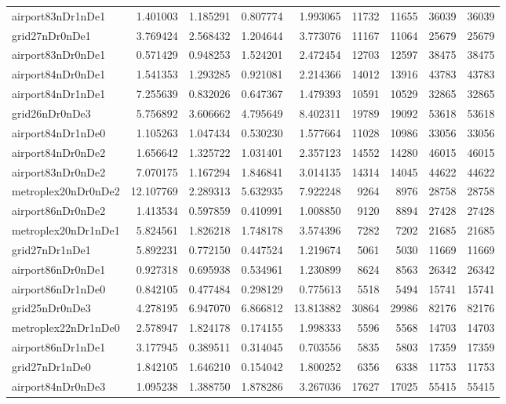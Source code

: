 \begin{longtable}{|l|r|r|r|r|r|r|r|r|}
airport83nDr1nDe1 & 1.401003 & 1.185291 & 0.807774 & 1.993065 & 11732 & 11655 & 36039 & 36039 \\
grid27nDr0nDe1 & 3.769424 & 2.568432 & 1.204644 & 3.773076 & 11167 & 11064 & 25679 & 25679 \\
airport83nDr0nDe1 & 0.571429 & 0.948253 & 1.524201 & 2.472454 & 12703 & 12597 & 38475 & 38475 \\
airport84nDr0nDe1 & 1.541353 & 1.293285 & 0.921081 & 2.214366 & 14012 & 13916 & 43783 & 43783 \\
airport84nDr1nDe1 & 7.255639 & 0.832026 & 0.647367 & 1.479393 & 10591 & 10529 & 32865 & 32865 \\
grid26nDr0nDe3 & 5.756892 & 3.606662 & 4.795649 & 8.402311 & 19789 & 19092 & 53618 & 53618 \\
airport84nDr1nDe0 & 1.105263 & 1.047434 & 0.530230 & 1.577664 & 11028 & 10986 & 33056 & 33056 \\
airport84nDr0nDe2 & 1.656642 & 1.325722 & 1.031401 & 2.357123 & 14552 & 14280 & 46015 & 46015 \\
airport83nDr0nDe2 & 7.070175 & 1.167294 & 1.846841 & 3.014135 & 14314 & 14045 & 44622 & 44622 \\
metroplex20nDr0nDe2 & 12.107769 & 2.289313 & 5.632935 & 7.922248 & 9264 & 8976 & 28758 & 28758 \\
airport86nDr0nDe2 & 1.413534 & 0.597859 & 0.410991 & 1.008850 & 9120 & 8894 & 27428 & 27428 \\
metroplex20nDr1nDe1 & 5.824561 & 1.826218 & 1.748178 & 3.574396 & 7282 & 7202 & 21685 & 21685 \\
grid27nDr1nDe1 & 5.892231 & 0.772150 & 0.447524 & 1.219674 & 5061 & 5030 & 11669 & 11669 \\
airport86nDr0nDe1 & 0.927318 & 0.695938 & 0.534961 & 1.230899 & 8624 & 8563 & 26342 & 26342 \\
airport86nDr1nDe0 & 0.842105 & 0.477484 & 0.298129 & 0.775613 & 5518 & 5494 & 15741 & 15741 \\
grid25nDr0nDe3 & 4.278195 & 6.947070 & 6.866812 & 13.813882 & 30864 & 29986 & 82176 & 82176 \\
metroplex22nDr1nDe0 & 2.578947 & 1.824178 & 0.174155 & 1.998333 & 5596 & 5568 & 14703 & 14703 \\
airport86nDr1nDe1 & 3.177945 & 0.389511 & 0.314045 & 0.703556 & 5835 & 5803 & 17359 & 17359 \\
grid27nDr1nDe0 & 1.842105 & 1.646210 & 0.154042 & 1.800252 & 6356 & 6338 & 11753 & 11753 \\
airport84nDr0nDe3 & 1.095238 & 1.388750 & 1.878286 & 3.267036 & 17627 & 17025 & 55415 & 55415 \\

\end{longtable}
